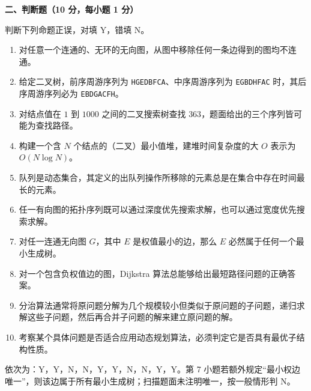 \textbf{二、判断题（10 分，每小题 1 分）}
\begin{question}
判断下列命题正误，对填 Y，错填 N。
\begin{enumerate}
  \item 对任意一个连通的、无环的无向图，从图中移除任何一条边得到的图均不连通。
  \item 给定二叉树，前序周游序列为 \texttt{HGEDBFCA}、中序周游序列为 \texttt{EGBDHFAC} 时，其后序周游序列必为 \texttt{EBDGACFH}。
  \item 对结点值在 $1$ 到 $1000$ 之间的二叉搜索树查找 $363$，题面给出的三个序列皆可能为查找路径。
  \item 构建一个含 $N$ 个结点的（二叉）最小值堆，建堆时间复杂度的大 $O$ 表示为 $O(N\log N)$。
  \item 队列是动态集合，其定义的出队列操作所移除的元素总是在集合中存在时间最长的元素。
  \item 任一有向图的拓扑序列既可以通过深度优先搜索求解，也可以通过宽度优先搜索求解。
  \item 对任一连通无向图 $G$，其中 $E$ 是权值最小的边，那么 $E$ 必然属于任何一个最小生成树。
  \item 对一个包含负权值边的图，Dijkstra 算法总能够给出最短路径问题的正确答案。
  \item 分治算法通常将原问题分解为几个规模较小但类似于原问题的子问题，递归求解这些子问题，然后再合并子问题的解来建立原问题的解。
  \item 考察某个具体问题是否适合应用动态规划算法，必须判定它是否具有最优子结构性质。
\end{enumerate}
\begin{solution}
依次为：Y，Y，N，N，Y，Y，N，N，Y，Y。第 7 小题若额外规定“最小权边唯一”，则该边属于所有最小生成树；扫描题面未注明唯一，按一般情形判 N。
\end{solution}
\end{question}

